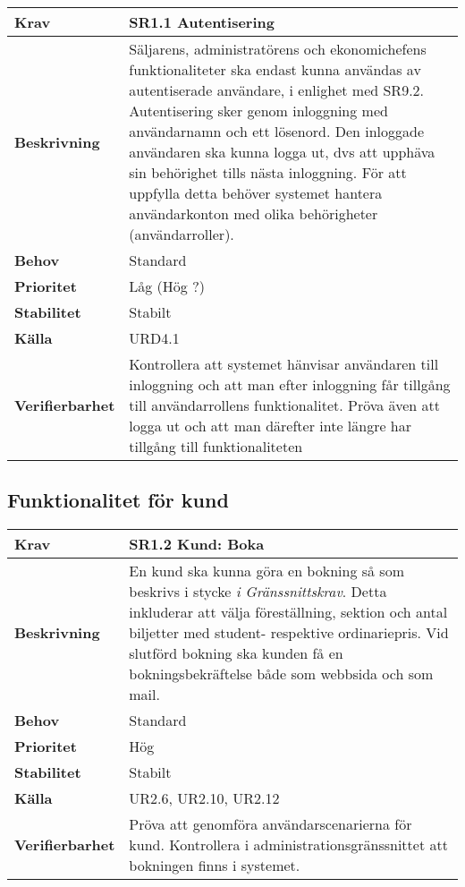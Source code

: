 \documentclass[a4paper, twoside, 11pt, titlepage]{article}
\begin{document}
	\begin{tabular} { p{2.6cm} p{12.5cm} }
		\hline
		\sffamily\textbf{Krav} & \sffamily\textbf{SR1.1 Autentisering } \\
		\hline
		\sffamily\textbf{Beskrivning} & Säljarens, administratörens och ekonomichefens funktionaliteter ska endast kunna användas av autentiserade användare, i enlighet med SR9.2. Autentisering sker genom inloggning med användarnamn och ett lösenord. Den inloggade användaren ska kunna logga ut, dvs att upphäva sin behörighet tills nästa inloggning. För att uppfylla detta behöver systemet hantera användarkonton med olika behörigheter (användarroller).  \\
		\hline
		\sffamily\textbf{Behov} & Standard  \\
		\hline
		\sffamily\textbf{Prioritet} & Låg (Hög ?)  \\
		\hline
		\sffamily\textbf{Stabilitet} & Stabilt  \\
		\hline
		\sffamily\textbf{Källa} & URD4.1  \\
		\hline
		\sffamily\textbf{Verifierbarhet} & Kontrollera att systemet hänvisar användaren till inloggning och att man efter inloggning får tillgång till användarrollens funktionalitet. Pröva även att logga ut och att man därefter inte längre har tillgång till funktionaliteten  \\
		\hline
	\end{tabular}


	\subsection{Funktionalitet för kund}


	\begin{tabular} { p{2.6cm} p{12.5cm} }
		\hline
		\sffamily\textbf{Krav} & \sffamily\textbf{SR1.2 Kund: Boka } \\
		\hline
		\sffamily\textbf{Beskrivning} & En kund ska kunna göra en bokning så som beskrivs i stycke \emph{i Gränssnittskrav}. Detta inkluderar att välja föreställning, sektion och antal biljetter med student- respektive ordinariepris. Vid slutförd bokning ska kunden få en bokningsbekräftelse både som webbsida och som mail.  \\
		\hline
		\sffamily\textbf{Behov} & Standard  \\
		\hline
		\sffamily\textbf{Prioritet} & Hög  \\
		\hline
		\sffamily\textbf{Stabilitet} & Stabilt  \\
		\hline
		\sffamily\textbf{Källa} & UR2.6, UR2.10, UR2.12  \\
		\hline
		\sffamily\textbf{Verifierbarhet} & Pröva att genomföra användarscenarierna för kund. Kontrollera i administrationsgränssnittet att bokningen finns i systemet.  \\
		\hline
	\end{tabular}
	\vspace{6mm}
\end{document}
